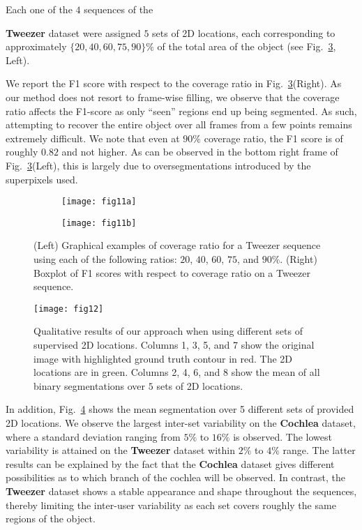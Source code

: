 Each one of the $4$ sequences of the {{\bf Tweezer} dataset were assigned $5$ sets of 2D locations, each corresponding to approximately $\{20, 40, 60, 75, 90\}\%$ of the total area of the object (see Fig.~\ref{fig:coverage}, Left).

We report the F1 score with respect to the coverage ratio in Fig.~\ref{fig:coverage}(Right). As our method does not resort to frame-wise filling, we observe that the coverage ratio affects the F1-score as only ``seen'' regions end up being segmented. As such, attempting to recover the entire object over all frames from a few points remains extremely difficult. We note that even at $90\%$ coverage ratio, the F1 score is of roughly $0.82$ and not higher. As can be observed in the bottom right frame of Fig.~\ref{fig:coverage}(Left), this is largely due to oversegmentations introduced by the superpixels used.
\begin{figure}
\centering
\begin{subfigure}{.49\textwidth}
  \centering
  \texttt{[image: fig11a]}
  \label{fig:sub2}
\end{subfigure}
\begin{subfigure}{.49\textwidth}
  \centering
  \texttt{[image: fig11b]}
  \label{fig:sub1}
\end{subfigure}%
\caption{(Left) Graphical examples of coverage ratio for a Tweezer sequence using each of the following ratios: $20$, $40$, $60$, $75$, and $90\%$. (Right) Boxplot of F1 scores with respect to coverage ratio on a Tweezer sequence. 
}
\label{fig:coverage}
\end{figure}

\begin{figure}[t]
\centering
\texttt{[image: fig12]}
\caption{Qualitative results of our approach when using different sets of supervised 2D locations. Columns 1, 3, 5, and 7 show the original image with highlighted ground truth contour in red. The 2D locations are in green. Columns 2, 4, 6, and 8 show the mean of all binary segmentations over $5$ sets of 2D locations.}
\label{fig:multigaze}
\end{figure}

In addition, Fig.~\ref{fig:multigaze} shows the mean segmentation over 5 different sets of provided 2D locations. We observe the largest inter-set variability on the {\bf Cochlea} dataset, where a standard deviation ranging from $5\%$ to $16\%$ is observed. The lowest variability is attained on the {\bf Tweezer} dataset within $2\%$ to $4\%$ range. The latter results can be explained by the fact that the {\bf Cochlea} dataset gives different possibilities as to which branch of the cochlea will be observed. In contrast, the {\bf Tweezer} dataset shows a stable appearance and shape throughout the sequences, thereby limiting the inter-user variability as each set covers roughly the same regions of the object.

}
